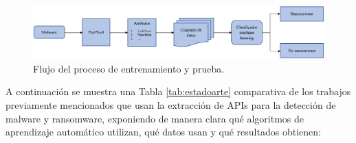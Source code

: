 \begin{figure}[htb]
\begin{center}
\includegraphics[width=1\linewidth]{images/hpc.PNG}
\end{center}
\caption{Flujo del proceso de entrenamiento y prueba.}
\label{fig:im13}
\end{figure}


A continuación se muestra una Tabla \ref{tab:estadoarte} comparativa de los trabajos previamente mencionados que usan la extracción de \gls{API}s para la detección de malware y ransomware, exponiendo de manera clara qué algoritmos de aprendizaje automático utilizan, qué datos usan y qué resultados obtienen:


